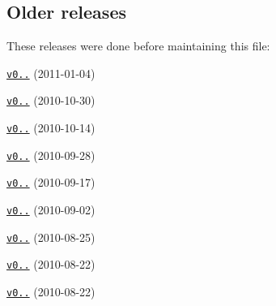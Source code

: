 \subsection*{Older releases}

These releases were done before maintaining this file\+:


\begin{DoxyItemize}
\item \href{https://github.com/felixge/node-mysql/compare/v0.8.0...v0.9.0}{\tt v0..} (2011-\/01-\/04)
\item \href{https://github.com/felixge/node-mysql/compare/v0.7.0...v0.8.0}{\tt v0..} (2010-\/10-\/30)
\item \href{https://github.com/felixge/node-mysql/compare/v0.6.0...v0.7.0}{\tt v0..} (2010-\/10-\/14)
\item \href{https://github.com/felixge/node-mysql/compare/v0.5.0...v0.6.0}{\tt v0..} (2010-\/09-\/28)
\item \href{https://github.com/felixge/node-mysql/compare/v0.4.0...v0.5.0}{\tt v0..} (2010-\/09-\/17)
\item \href{https://github.com/felixge/node-mysql/compare/v0.3.0...v0.4.0}{\tt v0..} (2010-\/09-\/02)
\item \href{https://github.com/felixge/node-mysql/compare/v0.2.0...v0.3.0}{\tt v0..} (2010-\/08-\/25)
\item \href{https://github.com/felixge/node-mysql/compare/v0.1.0...v0.2.0}{\tt v0..} (2010-\/08-\/22)
\item \href{https://github.com/felixge/node-mysql/commits/v0.1.0}{\tt v0..} (2010-\/08-\/22) 
\end{DoxyItemize}